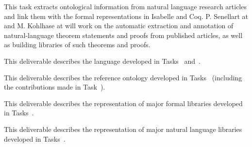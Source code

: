 \begin{workpackage}
\begin{tasklist}
\begin{task}[id=strtext,title=Ontological Representation of Natural Language Articles,lead=Inr,FauRM=6,InrRM=14]
This task extracts ontological information from natural language research articles and link them with the formal representations in Isabelle and Coq.
P. Senellart at  and M. Kohlhase at  will work on the automatic extraction and annotation of natural-language theorem statements and proofs from published articles, as well as building libraries of such theorems and proofs.
\end{task} 

%

\end{tasklist}

\begin{wpdelivs}
  \begin{wpdeliv}[due=18,miles=???,id=deliv-str-framework,dissem=PU,nature=DEM,lead=Sac]
  	{This deliverable describes the language developed in Tasks~ and~.}
  \end{wpdeliv}
  \begin{wpdeliv}[due=36,miles=???,id=deliv-str-ontology,dissem=PU,nature=DEM,lead=Sac]
  	{This deliverable describes the reference ontology developed in Tasks~ (including the contributions made in Task~).}
  \end{wpdeliv}
  \begin{wpdeliv}[due=48,miles=???,id=deliv-str-libraries,dissem=PU,nature=DEM,lead=Fau]
  	{This deliverable describes the representation of major formal libraries developed in Tasks~.}
  \end{wpdeliv}
  \begin{wpdeliv}[due=48,miles=???,id=deliv-str-natlang,dissem=PU,nature=DEM,lead=Fau]
  	{This deliverable describes the representation of major natural language libraries developed in Tasks~.}
  \end{wpdeliv}
\end{wpdelivs}




\end{workpackage}
